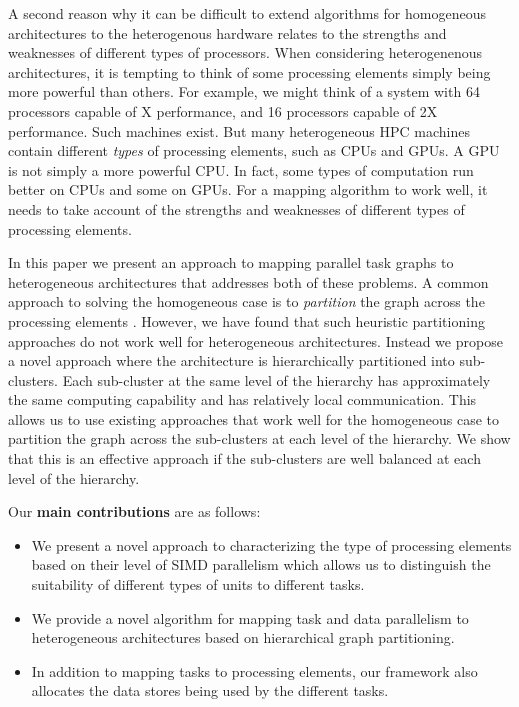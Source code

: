 A second reason why it can be difficult to extend algorithms for
homogeneous architectures to the heterogenous hardware relates to the
strengths and weaknesses of different types of processors. When
considering heterogenenous architectures, it is tempting to think of
some processing elements simply being more powerful than others. For
example, we might think of a system with 64 processors capable of X
performance, and 16 processors capable of 2X performance. Such machines
exist. But many heterogeneous HPC machines contain different
\textit{types} of processing elements, such as CPUs and GPUs. A GPU is
not simply a more powerful CPU. In fact, some types of computation run
better on CPUs and some on GPUs.  For a mapping algorithm to work well,
it needs to take account of the strengths and weaknesses of different
types of processing elements.

In this paper we present an approach to mapping parallel task graphs to
heterogeneous architectures that addresses both of these problems.  A
common approach to solving the homogeneous case is to \textit{partition}
the graph across the processing elements \cite{gkar98}\cite{gkar95}.
However, we have found that such heuristic partitioning approaches do
not work well for heterogeneous architectures. Instead we propose a
novel approach where the architecture is hierarchically partitioned into
sub-clusters.  Each sub-cluster at the same level of the hierarchy has
approximately the same computing capability and has relatively local
communication.  This allows us to use existing approaches that work well
for the homogeneous case to partition the graph across the sub-clusters
at each level of the hierarchy. We show that this is an effective
approach if the sub-clusters are well balanced at each level of the
hierarchy.

Our \textbf{main contributions} are as follows:
\begin{itemize}
\item We present a novel approach to characterizing the type of
  processing elements based on their level of SIMD parallelism which
  allows us to distinguish the suitability of different types of units
  to different tasks.
\item We provide a novel algorithm for mapping task and data parallelism
  to heterogeneous architectures based on hierarchical graph
  partitioning.
\item In addition to mapping tasks to processing elements, our framework
  also allocates the data stores being used by the different tasks.
\end{itemize}

